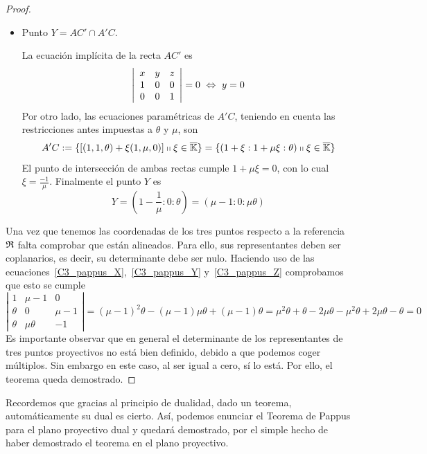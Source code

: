 \begin{proof}
\begin{itemize}
		
		\item Punto $Y=AC'\cap A'C$.
		
		La ecuación implícita de la recta $AC'$ es
		\begin{equation*}
			\left| \begin{array}{ccc}
				x & y & z\\
				1 & 0 & 0\\
				0 & 0 & 1
			\end{array}\right| =0 \ \Leftrightarrow \ y=0
		\end{equation*}
		Por otro lado, las ecuaciones paramétricas de $A'C$, teniendo en cuenta las restricciones antes impuestas a $\theta$ y $\mu$, son
		\begin{equation*}
			A'C:=\{[(1,1,\theta)+\xi(1,\mu,0)]\shortparallel \xi\in\overline{\mathbb{K}}\}=\{(1+\xi:1+\mu\xi:\theta)\shortparallel \xi\in\overline{\mathbb{K}}\}
		\end{equation*}
		El punto de intersección de ambas rectas cumple $1+\mu\xi=0$, con lo cual $\xi=\frac{-1}{\mu}$. Finalmente el punto $Y$ es
		\begin{equation}
			\label{C3_pappus_Y}
			Y=(1-\frac{1}{\mu}:0:\theta)=(\mu-1:0:\mu\theta)
		\end{equation}
		
	\end{itemize}
	Una vez que tenemos las coordenadas de los tres puntos respecto a la referencia $\mathfrak{R}$ falta comprobar que están alineados. Para ello, sus representantes deben ser coplanarios, es decir, su determinante debe ser nulo. Haciendo uso de las ecuaciones~\eqref{C3_pappus_X},~\eqref{C3_pappus_Y} y~\eqref{C3_pappus_Z} comprobamos que esto se cumple
	\begin{equation*}
		\left| \begin{array}{ccc}
			1 & \mu-1 & 0\\
			\theta & 0 & \mu-1\\
			\theta & \mu\theta & -1
		\end{array}\right| =(\mu-1)^2\theta-(\mu-1)\mu\theta+(\mu-1)\theta=\mu^2\theta+\theta-2\mu\theta-\mu^2\theta+2\mu\theta-\theta=0
	\end{equation*}
	Es importante observar que en general el determinante de los representantes de tres puntos proyectivos no está bien definido, debido a que podemos coger múltiplos. Sin embargo en este caso, al ser igual a cero, sí lo está. Por ello, el teorema queda demostrado.
\end{proof}
Recordemos que gracias al principio de dualidad, dado un teorema, automáticamente su dual es cierto. Así, podemos enunciar el Teorema de Pappus para el plano proyectivo dual y quedará demostrado, por el simple hecho de haber demostrado el teorema en el plano proyectivo.

